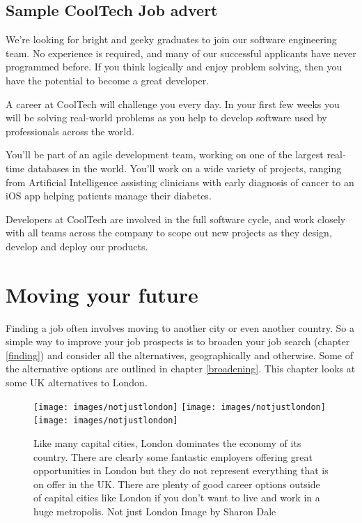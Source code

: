 \documentclass[
]{book}
\begin{document}
\hypertarget{cooltech}{%
\section{Sample CoolTech Job advert}\label{cooltech}}

We're looking for bright and geeky graduates to join our software engineering team. No experience is required, and many of our successful applicants have never programmed before. If you think logically and enjoy problem solving, then you have the potential to become a great developer.

A career at CoolTech will challenge you every day. In your first few weeks you will be solving real-world problems as you help to develop software used by professionals across the world.

You'll be part of an agile development team, working on one of the largest real-time databases in the world. You'll work on a wide variety of projects, ranging from Artificial Intelligence assisting clinicians with early diagnosis of cancer to an iOS app helping patients manage their diabetes.

Developers at CoolTech are involved in the full software cycle, and work closely with all teams across the company to scope out new projects as they design, develop and deploy our products.

\hypertarget{moving}{%
\chapter{Moving your future}\label{moving}}

Finding a job often involves moving to another city or even another country. So a simple way to improve your job prospects is to broaden your job search (chapter \ref{finding}) and consider all the alternatives, geographically and otherwise. Some of the alternative options are outlined in chapter \ref{broadening}. This chapter looks at some UK alternatives to London.

\begin{figure}
\texttt{[image: images/notjustlondon]} \texttt{[image: images/notjustlondon]} \texttt{[image: images/notjustlondon]} \caption{Like many capital cities, London dominates the economy of its country. There are clearly some fantastic employers offering great opportunities in London but they do not represent everything that is on offer in the UK. There are plenty of good career options outside of capital cities like London if you don't want to live and work in a huge metropolis. Not just London Image by Sharon Dale \citep{notjustlondon}}\label{fig:northern-fig}
\end{figure}
\end{document}
